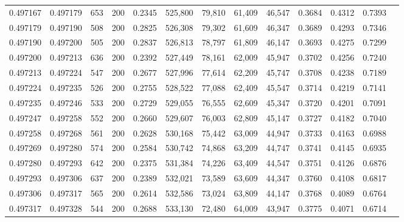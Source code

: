 \begin{tabular}{rrrrrrrrrrrrr}
0.497167 & 0.497179 &    653 & 200 &                                     0.2345 & 525,800 &  79,810 &  61,409 &  46,547 & 0.3684 & 0.4312 & 0.7393 \\
0.497179 & 0.497190 &    508 & 200 &                                     0.2825 & 526,308 &  79,302 &  61,609 &  46,347 & 0.3689 & 0.4293 & 0.7346 \\
0.497190 & 0.497200 &    505 & 200 &                                     0.2837 & 526,813 &  78,797 &  61,809 &  46,147 & 0.3693 & 0.4275 & 0.7299 \\
0.497200 & 0.497213 &    636 & 200 &                                     0.2392 & 527,449 &  78,161 &  62,009 &  45,947 & 0.3702 & 0.4256 & 0.7240 \\
0.497213 & 0.497224 &    547 & 200 &                                     0.2677 & 527,996 &  77,614 &  62,209 &  45,747 & 0.3708 & 0.4238 & 0.7189 \\
0.497224 & 0.497235 &    526 & 200 &                                     0.2755 & 528,522 &  77,088 &  62,409 &  45,547 & 0.3714 & 0.4219 & 0.7141 \\
0.497235 & 0.497246 &    533 & 200 &                                     0.2729 & 529,055 &  76,555 &  62,609 &  45,347 & 0.3720 & 0.4201 & 0.7091 \\
0.497247 & 0.497258 &    552 & 200 &                                     0.2660 & 529,607 &  76,003 &  62,809 &  45,147 & 0.3727 & 0.4182 & 0.7040 \\
0.497258 & 0.497268 &    561 & 200 &                                     0.2628 & 530,168 &  75,442 &  63,009 &  44,947 & 0.3733 & 0.4163 & 0.6988 \\
0.497269 & 0.497280 &    574 & 200 &                                     0.2584 & 530,742 &  74,868 &  63,209 &  44,747 & 0.3741 & 0.4145 & 0.6935 \\
0.497280 & 0.497293 &    642 & 200 &                                     0.2375 & 531,384 &  74,226 &  63,409 &  44,547 & 0.3751 & 0.4126 & 0.6876 \\
0.497293 & 0.497306 &    637 & 200 &                                     0.2389 & 532,021 &  73,589 &  63,609 &  44,347 & 0.3760 & 0.4108 & 0.6817 \\
0.497306 & 0.497317 &    565 & 200 &                                     0.2614 & 532,586 &  73,024 &  63,809 &  44,147 & 0.3768 & 0.4089 & 0.6764 \\
0.497317 & 0.497328 &    544 & 200 &                                     0.2688 & 533,130 &  72,480 &  64,009 &  43,947 & 0.3775 & 0.4071 & 0.6714 \\

\end{tabular}
